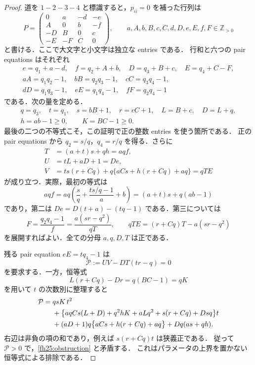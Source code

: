 \begin{proof}
道を $1-2-3-4$ と標識すると，$p_{ii}=0$ を補った行列は
\begin{equation}
 P=\begin{pmatrix}
  0&a&-d&-e\\
  A&0&b&-f\\
  -D&B&0&c\\
  -E&-F&C&0
 \end{pmatrix},
 \qquad a,A,b,B,c,C,d,D,e,E,f,F\in\mathbb Z_{>0}
 \label{fh25:path-matrix}
\end{equation}
と書ける．ここで大文字と小文字は独立な entries である．
行和と六つの pair equations はそれぞれ
\begin{gather}
 e=q_1+a-d,\quad f=q_2+A+b,\quad
 D=q_3+B+c,\quad E=q_4+C-F,
 \label{fh25:rows}\\
 aA=q_1q_2-1,\quad bB=q_2q_3-1,\quad cC=q_3q_4-1,
 \label{fh25:positive-pairs}\\
 dD=q_1q_3-1,\quad eE=q_1q_4-1,\quad fF=q_2q_4-1
 \label{fh25:negative-pairs}
\end{gather}
である．次の量を定める．
\begin{gather}
 q=q_3,\quad t=q_1,\quad s=bB+1,\quad r=cC+1,
 \quad L=B+c,\quad D=L+q,\label{fh25:abbreviations}\\
 h=ab-1\ge0,\qquad K=BC-1\ge0.
 \label{fh25:integer-inequalities}
\end{gather}
最後の二つの不等式こそ，この証明で正の整数 entries を使う箇所である．
正の pair equations から $q_2=s/q$，$q_4=r/q$ を得る．さらに
\begin{align}
 T&=(a+t)s+qh=aqf,\label{fh25:T}\\
 U&=tL+aD+1=De,\label{fh25:U}\\
 V&=ts(r+Cq)+q\{aCs+h(r+Cq)+aq\}=qTE
 \label{fh25:V}
\end{align}
が成り立つ．実際，最初の等式は
\[
 aqf=aq\left(\frac{s}{q}+\frac{ts/q-1}{a}+b\right)
      =(a+t)s+q(ab-1)
\]
であり，第二は $De=D(t+a)-(tq-1)$ である．第三については
\[
 F=\frac{q_2q_4-1}{f}=\frac{a(sr-q^2)}{qT},\qquad
 qTE=(r+Cq)T-a(sr-q^2)
\]
を展開すればよい．全ての分母 $a,q,D,T$ は正である．

残る pair equation $eE=tq_4-1$ は
\begin{equation}
 \mathcal P:=UV-DT(tr-q)=0
 \label{fh25:obstruction}
\end{equation}
を要求する．一方，恒等式
\begin{equation}
 L(r+Cq)-Dr=q(BC-1)=qK
 \label{fh25:key-identity}
\end{equation}
を用いて $t$ の次数別に整理すると
\begin{align}
 \mathcal P
 ={}&qsK\,t^2\notag\\
 &+\bigl\{aqCs(L+D)+q^2hK+aLq^2+s(r+Cq)+Dsq\bigr\}t\notag\\
 &+(aD+1)q\bigl\{aCs+h(r+Cq)+aq\bigr\}
       +Dq(as+qh).
 \label{fh25:positive-certificate}
\end{align}
右辺は非負の項の和であり，例えば $s(r+Cq)t$ は狭義正である．
従って $\mathcal P>0$ で，\eqref{fh25:obstruction} と矛盾する．
これはパラメータの上界を置かない恒等式による排除である．
\end{proof}

